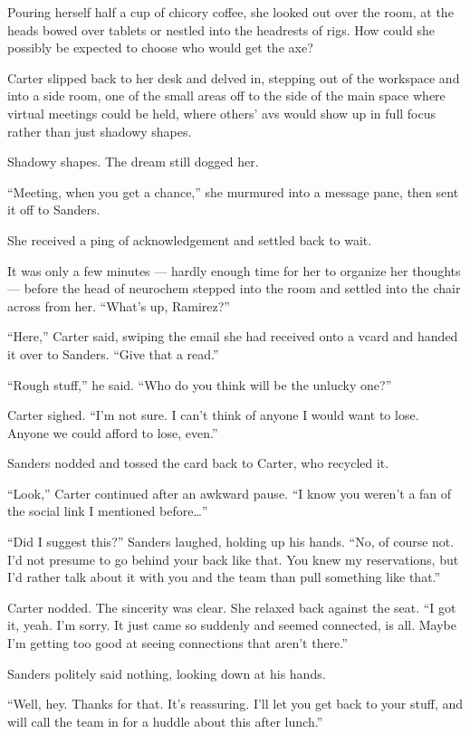 Pouring herself half a cup of chicory coffee, she looked out over the room, at the heads bowed over tablets or nestled into the headrests of rigs. How could she possibly be expected to choose who would get the axe?

Carter slipped back to her desk and delved in, stepping out of the workspace and into a side room, one of the small areas off to the side of the main space where virtual meetings could be held, where others' avs would show up in full focus rather than just shadowy shapes.

Shadowy shapes. The dream still dogged her.

``Meeting, when you get a chance,'' she murmured into a message pane, then sent it off to Sanders.

She received a ping of acknowledgement and settled back to wait.

It was only a few minutes — hardly enough time for her to organize her thoughts — before the head of neurochem stepped into the room and settled into the chair across from her. ``What's up, Ramirez?''

``Here,'' Carter said, swiping the email she had received onto a vcard and handed it over to Sanders. ``Give that a read.''

``Rough stuff,'' he said. ``Who do you think will be the unlucky one?''

Carter sighed. ``I'm not sure. I can't think of anyone I would want to lose. Anyone we could afford to lose, even.''

Sanders nodded and tossed the card back to Carter, who recycled it.

``Look,'' Carter continued after an awkward pause. ``I know you weren't a fan of the social link I mentioned before\ldots{}''

``Did I suggest this?'' Sanders laughed, holding up his hands. ``No, of course not. I'd not presume to go behind your back like that. You knew my reservations, but I'd rather talk about it with you and the team than pull something like that.''

Carter nodded. The sincerity was clear. She relaxed back against the seat. ``I got it, yeah. I'm sorry. It just came so suddenly and seemed connected, is all. Maybe I'm getting too good at seeing connections that aren't there.''

Sanders politely said nothing, looking down at his hands.

``Well, hey. Thanks for that. It's reassuring. I'll let you get back to your stuff, and will call the team in for a huddle about this after lunch.''

